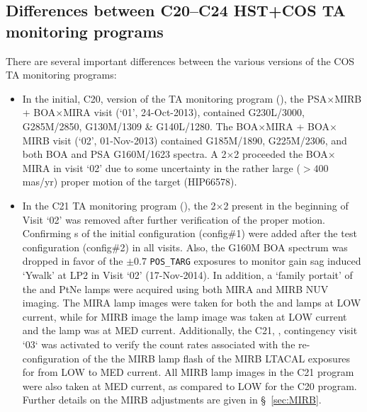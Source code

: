 \subsection{Differences between C20--C24 HST+COS TA monitoring programs}\label{subsec:differences}

There are several important differences between the various versions of the COS TA monitoring programs:

\begin{itemize}
\item{
In the initial, C20, version of the TA monitoring program (),
the PSA$\times$MIRB + BOA$\times$MIRA  visit (`01', 24-Oct-2013), contained G230L/3000, G285M/2850, G130M/1309 \& G140L/1280.
The BOA$\times$MIRA + BOA$\times$MIRB  visit (`02', 01-Nov-2013) contained G185M/1890, G225M/2306, and both BOA and PSA G160M/1623 spectra.
A 2$\times$2  proceeded the BOA$\times$MIRA  in visit `02' due to some uncertainty in the rather large ($> 400$ mas/yr) proper motion of the target (HIP66578).
}
\item{
In the C21 TA monitoring program (), the 2$\times$2  present in the beginning of Visit `02' was removed after further verification of the proper motion.
Confirming s of the initial configuration (config\#1) were added after the test configuration (config\#2) in all visits.
Also, the G160M BOA spectrum was dropped in favor of the $\pm 0.7$\arcsec{} \texttt{POS\_TARG} exposures to monitor gain sag induced `Ywalk' at LP2 in Visit `02' (17-Nov-2014).
In addition, a `family portait' of the \plampone and \plamptwo PtNe lamps were acquired using both MIRA and MIRB NUV imaging.
The MIRA lamp images were taken for both the \plampone and \plamptwo lamps at LOW current, while for MIRB image the \plampone lamp image was taken at LOW current and the \plamptwo lamp was at MED current.
Additionally, the C21, , contingency visit `03` was activated to verify the count rates associated with the re-configuration of the
the MIRB  lamp flash of the MIRB \textsc{LTACAL} exposures for \plamptwo from LOW to MED current.
All MIRB lamp images in the C21 program were also taken at MED current, as  compared to LOW for the C20 program.
Further details on the MIRB  adjustments are given in \S~\ref{sec:MIRB}.\\

}
\end{itemize}
